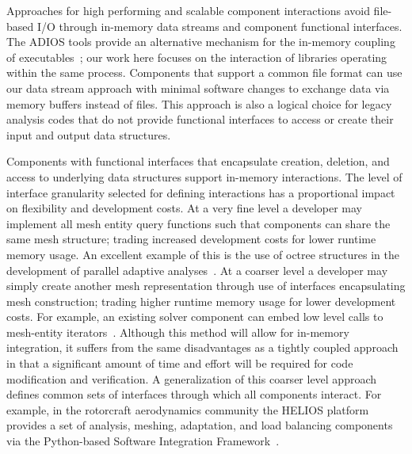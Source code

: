 \documentclass[a4paper]{article}
\begin{document}
Approaches for high performing and scalable component interactions avoid
file-based I/O through in-memory data streams and component functional
interfaces.
The ADIOS tools provide an alternative mechanism for the in-memory coupling of
executables~\cite{bennett2012combining,zhang2012enabling}; our work here focuses
on the interaction of libraries operating within the same process.
Components that support a common file format can use our data stream approach
with minimal software changes to exchange data via memory buffers instead of files.
This approach is also a logical choice for legacy analysis codes that do not
provide functional interfaces to access or create their input and output data
structures.

Components with functional interfaces that encapsulate creation, deletion, and
access to underlying data structures support in-memory interactions.
The level of interface granularity selected for defining interactions has a
proportional impact on flexibility and development costs.
At a very fine level a developer may implement all mesh entity query functions such
that components can share the same mesh structure; trading increased development
costs for lower runtime memory usage.
An excellent example of this is the use of octree structures in the
development of parallel adaptive analyses~\cite{BursteddeWilcoxGhattas11}.
At a coarser level a developer may simply create another mesh
representation through use of interfaces encapsulating mesh construction;
trading higher runtime memory usage for lower development costs.
For example, an existing solver component can embed low level
calls to mesh-entity iterators~\cite{Ollivier10}.
Although this method will allow for in-memory integration, it suffers from the
same disadvantages as a tightly coupled approach in that a significant amount of
time and effort will be required for code modification and verification.
A generalization of this coarser level approach defines common sets of
interfaces through which all components interact.
For example, in the rotorcraft aerodynamics community the HELIOS platform
provides a set of analysis, meshing, adaptation, and load balancing components
via the Python-based Software Integration Framework~\cite{sankaran2010application}.
\end{document}
